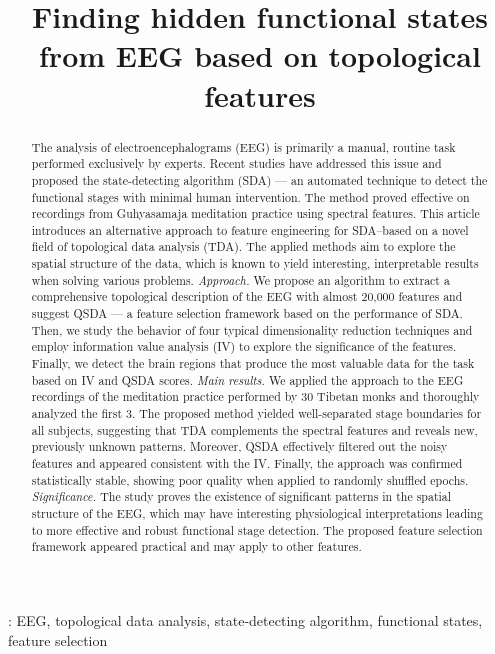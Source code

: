 \documentclass[10pt]{iopart}
\begin{document}
\title[Finding hidden functional states from EEG based on topological features]
        {Finding hidden functional states from EEG based on topological features}

\begin{abstract}

The analysis of electroencephalograms (EEG) is primarily a manual, routine task performed exclusively by experts. Recent studies have addressed this issue and proposed the state-detecting algorithm (SDA) --- an automated technique to detect the functional stages with minimal human intervention. The method proved effective on recordings from Guhyasamaja meditation practice using spectral features. This article introduces an alternative approach to feature engineering for SDA--based on a novel field of topological data analysis (TDA). The applied methods aim to explore the spatial structure of the data, which is known to yield interesting, interpretable results when solving various problems.
\textit{Approach.}
We propose an algorithm to extract a comprehensive topological description of the EEG with almost 20,000 features and suggest QSDA --- a feature selection framework based on the performance of SDA\@. Then, we study the behavior of four typical dimensionality reduction techniques and employ information value analysis (IV) to explore the significance of the features. Finally, we detect the brain regions that produce the most valuable data for the task based on IV and QSDA scores.
\textit{Main results.}
We applied the approach to the EEG recordings of the meditation practice performed by 30 Tibetan monks and thoroughly analyzed the first 3. The proposed method yielded well-separated stage boundaries for all subjects, suggesting that TDA complements the spectral features and reveals new, previously unknown patterns. Moreover, QSDA effectively filtered out the noisy features and appeared consistent with the IV\@. Finally, the approach was confirmed statistically stable, showing poor quality when applied to randomly shuffled epochs.
\textit{Significance.}
The study proves the existence of significant patterns in the spatial structure of the EEG, which may have interesting physiological interpretations leading to more effective and robust functional stage detection. The proposed feature selection framework appeared practical and may apply to other features.

\end{abstract}

\vspace{2pc}
: EEG, topological data analysis, state-detecting algorithm, functional states, feature selection
\end{document}
